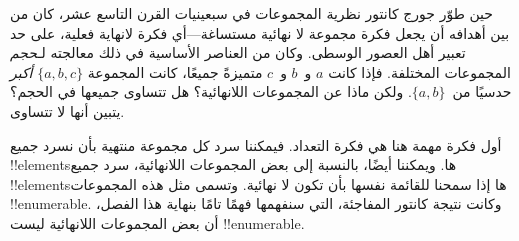 \documentclass[../../../include/open-logic-section]{subfiles}
\begin{document}


حين طوّر جورج كانتور نظرية المجموعات في سبعينيات القرن التاسع عشر، كان
من بين أهدافه أن يجعل فكرة مجموعة لا نهائية مستساغة---أي فكرة
لانهاية فعلية، على حد تعبير أهل العصور الوسطى. وكان من العناصر
الأساسية في ذلك معالجته لـ\emph{حجم} المجموعات المختلفة. فإذا كانت
$a$ و~$b$ و~$c$ متميزةً جميعًا، كانت المجموعة $\{a, b, c\}$
\emph{أكبر} حدسيًا من~$\{a, b\}$. ولكن ماذا عن المجموعات اللانهائية؟
هل تتساوى جميعها في الحجم؟ يتبين أنها لا تتساوى.

أول فكرة مهمة هنا هي فكرة التعداد. فيمكننا سرد كل مجموعة منتهية بأن
نسرد جميع !!{element}sها. ويمكننا أيضًا، بالنسبة إلى بعض المجموعات
اللانهائية، سرد جميع !!{element}sها إذا سمحنا للقائمة نفسها بأن تكون
لا نهائية. وتسمى مثل هذه المجموعات !!{enumerable}. وكانت نتيجة كانتور
المفاجئة، التي سنفهمها فهمًا تامًا بنهاية هذا الفصل، أن بعض المجموعات
اللانهائية ليست !!{enumerable}.
\end{document}
